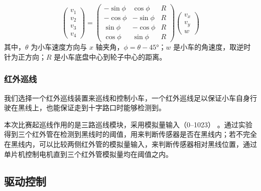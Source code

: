 \documentclass[10pt]{ctexart}
\begin{document}
\begin{equation*}
    \begin{pmatrix}
        v_1 \\v_2\\v_3\\v_4
    \end{pmatrix}
    =
    \begin{pmatrix}
        -\sin \phi & \cos \phi  & R \\
        -\cos \phi & -\sin \phi & R \\
        \sin \phi  & -\cos \phi & R \\
        \cos \phi  & \sin \phi  & R
    \end{pmatrix}
    \begin{pmatrix}
        v_x \\v_y\\ w
    \end{pmatrix}
\end{equation*}
其中，$\theta$ 为小车速度方向与 $x$ 轴夹角，$\phi= \theta - 45\si{\degree}$；$w$ 是小车的角速度，取逆时针为正方向；$R$ 是小车底盘中心到轮子中心的距离。

\subsubsection{红外巡线}
我们选择一个红外巡线装置来巡线和控制小车，一个红外巡线足以保证小车自身行驶在黑线上，也能保证走到十字路口时能够检测到。

本次比赛起巡线作用的是三路巡线模块，采用模拟量输入（\SIrange{0}{1023}{}） 。通过实验得到三个红外管在检测到黑线时的阈值，用来判断传感器是否在黑线内；若不完全在黑线内，可以比较两侧红外管的模拟量输入，来判断传感器相对黑线位置，通过单片机控制电机直到三个红外管模拟量均在阈值之内。

\subsection{驱动控制}
\end{document}
